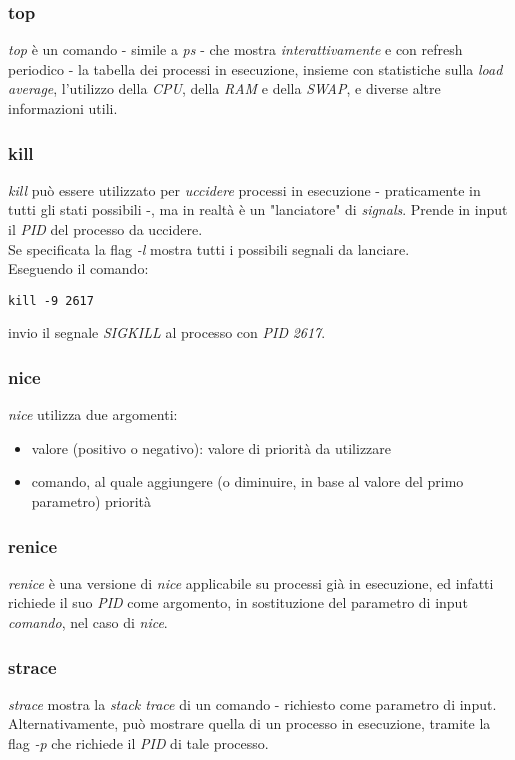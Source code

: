 \subsubsection{top}
\textit{top} è un comando - simile a \textit{ps} - che mostra \textit{interattivamente} e con refresh periodico - la tabella dei processi in esecuzione, insieme con statistiche sulla \textit{load average}, l'utilizzo della \textit{CPU}, della \textit{RAM} e della \textit{SWAP}, e diverse altre informazioni utili.

\subsubsection{kill}
\textit{kill} può essere utilizzato per \textit{uccidere} processi in esecuzione - praticamente in tutti gli stati possibili -, ma in realtà è un "lanciatore" di \textit{signals}.
Prende in input il \textit{PID} del processo da uccidere. \\
Se specificata la flag \textit{-l} mostra tutti i possibili segnali da lanciare. \\
Eseguendo il comando:
\begin{lstlisting}
kill -9 2617
\end{lstlisting}
invio il segnale \textit{SIGKILL} al processo con \textit{PID} \textit{2617}. 

\subsubsection{nice}
\textit{nice} utilizza due argomenti:
\begin{itemize}
    \item valore (positivo o negativo): valore di priorità da utilizzare
    \item comando, al quale aggiungere (o diminuire, in base al valore del primo parametro) priorità
\end{itemize}

\subsubsection{renice}
\textit{renice} è una versione di \textit{nice} applicabile su processi già in esecuzione, ed infatti richiede il suo \textit{PID} come argomento, in sostituzione del parametro di input \textit{comando}, nel caso di \textit{nice}.

\subsubsection{strace}
\textit{strace} mostra la \textit{stack trace} di un comando - richiesto come parametro di input. Alternativamente, può mostrare quella di un processo in esecuzione, tramite la flag \textit{-p} che richiede il \textit{PID} di tale processo.